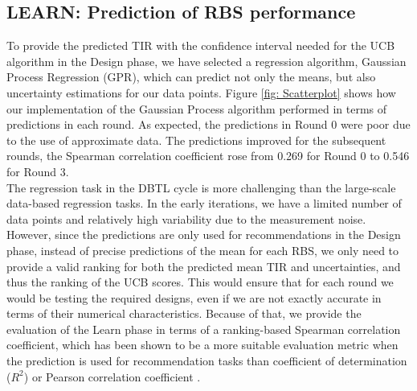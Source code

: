 \documentclass{article}
\begin{document}
\subsection{LEARN: Prediction of RBS performance}
\label{sec:gp-results}
\label{subsec: results LEARN}

To provide the predicted TIR with the confidence interval needed for the UCB algorithm in the Design phase, we have selected a regression algorithm, Gaussian Process Regression (GPR),  which can predict not only the means, but also uncertainty estimations for our data points.
Figure \ref{fig: Scatterplot} shows how our implementation of the Gaussian Process algorithm performed in terms of predictions in each round. As expected, the predictions in Round 0 were poor due to the use of approximate data.
The predictions improved for the subsequent rounds,
the Spearman correlation coefficient rose from 0.269 for Round 0 to 0.546 for Round 3.
\\

The regression task in the DBTL cycle is more challenging than the large-scale data-based regression tasks.
In the early iterations, we have a limited number of data points and relatively high variability due to the measurement noise.
However, since the predictions are only used for recommendations in the Design phase, instead of precise predictions of the mean for each RBS, we only need to provide a valid ranking for both the predicted mean TIR and uncertainties, and thus the ranking of the UCB scores.
This would ensure that for each round we would be testing the required designs, even if we are not exactly accurate in terms of their numerical characteristics.
Because of that, we provide the evaluation of the Learn phase in terms of a ranking-based Spearman correlation coefficient, which has been shown to be a more suitable evaluation metric when the prediction is used for recommendation tasks than coefficient of determination ($R^2$) or Pearson correlation coefficient
\cite{Schober2018,  Kang2019}.\\
\end{document}
